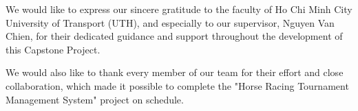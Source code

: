 
We would like to express our sincere gratitude to the faculty of Ho Chi Minh City University of Transport (UTH), and especially to our supervisor, Nguyen Van Chien, for their dedicated guidance and support throughout the development of this Capstone Project.

We would also like to thank every member of our team for their effort and close collaboration, which made it possible to complete the "Horse Racing Tournament Management System" project on schedule.
